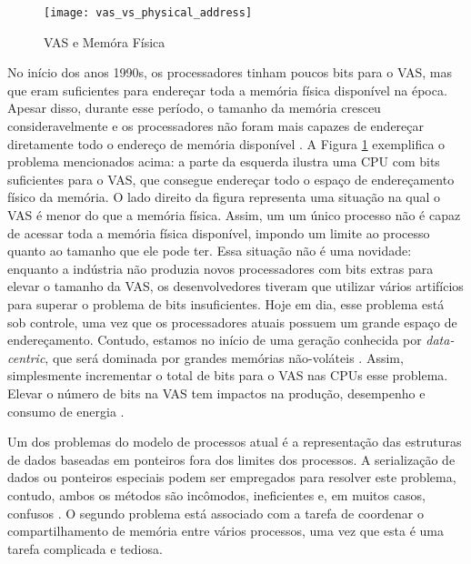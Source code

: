 \begin{figure}[!h]
  \centering
  \texttt{[image: vas\_vs\_physical\_address]} 
  \caption{VAS e Memóra Física}
  \label{fig:vas_vs_physical} 
\end{figure}

No início dos anos 1990s, os processadores tinham poucos bits para o VAS, mas que eram suficientes
para endereçar toda a memória física disponível na época. Apesar disso, durante
esse período, o tamanho da memória cresceu consideravelmente e os processadores
não foram mais capazes de endereçar diretamente todo o endereço de memória disponível
\cite{crowley}. A Figura \ref{fig:vas_vs_physical} exemplifica o problema
mencionados acima: a parte da esquerda ilustra uma CPU com bits suficientes
para o VAS, que consegue endereçar todo o espaço de endereçamento
físico da memória. O lado direito da figura representa uma situação na qual o
VAS é menor do que a memória física. Assim, um um único processo não é capaz de
acessar toda a memória física disponível, impondo um limite ao processo
quanto ao tamanho que ele pode ter. Essa situação
não é uma novidade: enquanto a indústria não produzia
novos processadores com bits extras para elevar o tamanho da VAS, os
desenvolvedores tiveram que utilizar vários artifícios para superar o
problema de bits insuficientes. Hoje em dia, esse problema está sob controle,
uma vez que os processadores atuais possuem um grande espaço de endereçamento.
Contudo, estamos no início de uma geração conhecida por \emph{data-centric},
que será dominada por grandes memórias não-voláteis \citep{outlook}. Assim,
simplesmente incrementar o total de bits para o VAS nas CPUs 
esse problema. Elevar o número de bits na VAS tem impactos na produção,
desempenho e consumo de energia \citep{spacejmp}.

Um dos problemas do modelo de processos atual é a representação
das estruturas de dados baseadas em ponteiros fora dos
limites dos processos. A serialização de dados ou ponteiros especiais podem ser
empregados para resolver este problema, contudo, ambos os métodos são
incômodos, ineficientes e, em muitos casos, confusos \citep{spacejmp}. O segundo
problema está associado com a tarefa de coordenar o compartilhamento de memória
entre vários processos, uma vez que esta é uma tarefa complicada e tediosa.

